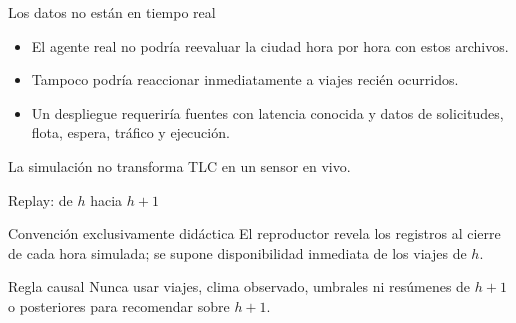\documentclass[aspectratio=169,11pt]{beamer}
\begin{document}
\begin{frame}{Los datos no están en tiempo real}
  \begin{center}
  \end{center}
  \begin{itemize}
    \item El agente real no podría reevaluar la ciudad hora por hora con estos archivos.
    \item Tampoco podría reaccionar inmediatamente a viajes recién ocurridos.
    \item Un despliegue requeriría fuentes con latencia conocida y datos de solicitudes, flota, espera, tráfico y ejecución.
  \end{itemize}
  \alert{La simulación no transforma TLC en un sensor en vivo.}
\end{frame}

\begin{frame}{Replay: de $h$ hacia $h+1$}
  \centering
  \vfill
  \begin{block}{Convención exclusivamente didáctica}
    El reproductor revela los registros al cierre de cada hora simulada; se supone disponibilidad inmediata de los viajes de $h$.
  \end{block}
  \begin{alertblock}{Regla causal}
    Nunca usar viajes, clima observado, umbrales ni resúmenes de $h+1$ o posteriores para recomendar sobre $h+1$.
  \end{alertblock}
\end{frame}
\end{document}
